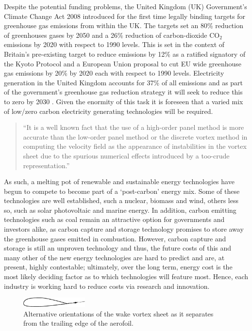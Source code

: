 Despite the potential funding problems, the United Kingdom (UK) Government's
Climate Change Act 2008 \citep*[see][2008]{CCA:2008:Defra} introduced for the
first time legally binding targets for greenhouse gas emissions from within the
UK. The targets set an 80\% reduction of greenhouses gases by 2050 and a 26\%
reduction of carbon-dioxide $\text{CO}_{2}$ emissions by 2020 with respect to
1990 levels. This is set in the context of Britain's pre-existing target to
reduce emissions by 12\% as a ratified signatory of the Kyoto Protocol
and a European Union proposal to cut EU wide greenhouse gas emissions by 20\% by
2020 each with respect to 1990 levels. Electricity generation in the United
Kingdom accounts for 37\% of all emissions and as part of the
government's greenhouse gas reduction strategy it will seek to reduce this to
zero by 2030 \citep[see][2008]{CCC:2008}. Given the enormity of this task it is
foreseen that a varied mix of low/zero carbon electricity generating
technologies will be required.
\begin{quote}
 ``It is a well known fact that the use of a high-order panel method is more
accurate than the
low-order panel method or the discrete vortex method in computing the velocity
field as the
appearance of instabilities in the vortex sheet due to the spurious numerical
effects introduced by
a too-crude representation.''
\end{quote}
As such, a melting pot of renewable and sustainable energy technologies have
begun to compete to become part of a `post-carbon' energy mix. Some of these
technologies are well established, such a nuclear, biomass and wind, others less
so, such as solar photovoltaic and marine energy. In addition, carbon emitting
technologies such as coal remain an attractive option for governments and
investors alike, as carbon capture and storage technology promises to store away
the greenhouse gases emitted in combustion. However, carbon capture and storage
is still an unproven technology and thus, the future costs of this and many
other of the new energy technologies are hard to predict and are, at present,
highly contestable; ultimately, over the long term, energy cost is the most
likely deciding factor as to which technologies will feature most. Hence, each
industry is working hard to reduce costs via research and innovation.

\begin{figure}[htb]
\centering
\includegraphics[width=0.3\textwidth]{bottomkutta.eps}
\caption{Alternative orientations of the wake vortex sheet as it separates from
the trailing edge of the aerofoil.}
\label{fig:bottomkutta}
\end{figure}